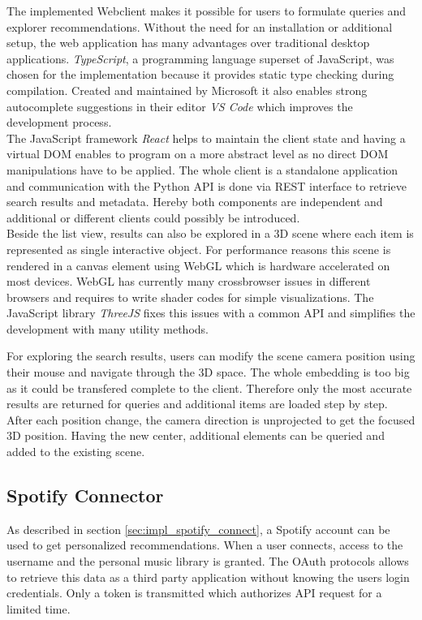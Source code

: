 \documentclass[sigconf]{acmart}
\begin{document}
The implemented Webclient makes it possible for users to formulate queries and explorer recommendations. Without the need for an installation or additional setup, the web application has many advantages over traditional desktop applications. \emph{TypeScript}, a programming language superset of JavaScript, was chosen for the implementation because it provides static type checking during compilation. Created and maintained by Microsoft it also enables strong autocomplete suggestions in their editor \emph{VS Code} which improves the development process. \\
The JavaScript framework \emph{React} helps to maintain the client state and having a virtual DOM enables to program on a more abstract level as no direct DOM manipulations have to be applied. The whole client is a standalone application and communication with the Python API is done via REST interface to retrieve search results and metadata. Hereby both components are independent and additional or different clients could possibly be introduced. \\

Beside the list view, results can also be explored in a 3D scene where each item is represented as single interactive object. For performance reasons this scene is rendered in a canvas element using WebGL which is hardware accelerated on most devices. WebGL has currently many crossbrowser issues in different browsers and requires to write shader codes for simple visualizations. The JavaScript library \emph{ThreeJS} fixes this issues with a common API and simplifies the development with many utility methods.

For exploring the search results, users can modify the scene camera position using their mouse and navigate through the 3D space. The whole embedding is too big as it could be transfered complete to the client. Therefore only the most accurate results are returned for queries and additional items are loaded step by step. After each position change, the camera direction is unprojected to get the focused 3D position. Having the new center, additional elements can be queried and added to the existing scene.

\subsection{Spotify Connector}
As described in section \ref{sec:impl_spotify_connect}, a Spotify account can be used to get personalized recommendations. When a user connects, access to the username and the personal music library is granted. The OAuth protocols allows to retrieve this data as a third party application without knowing the users login credentials. Only a token is transmitted which authorizes API request for a limited time.
\end{document}
